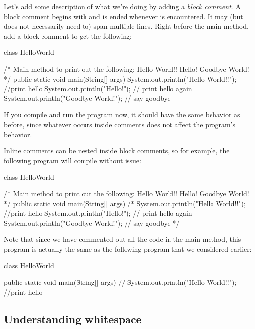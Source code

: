 Let's add some description of what we're doing by adding a \emph{block comment}.
A block comment begins with \ic{/*} and is ended whenever \ic{*/} is encountered.
It may (but does not necessarily need to) span multiple lines.
Right before the main method, add a block comment to get the following:
\begin{code}
class HelloWorld {

    /* Main method to print out the following:
         Hello World!!
         Hello!
         Goodbye World!
    */
    public static void main(String[] args) {
        System.out.println("Hello World!!"); //print hello
        System.out.println("Hello!"); // print hello again
        System.out.println("Goodbye World!"); // say goodbye
    }

}
\end{code}
If you compile and run the program now, it should have the same behavior as before, since whatever occurs
inside comments does not affect the program's behavior.

Inline comments can be nested inside block comments, so for example, the following program
will compile without issue:
\begin{code}
class HelloWorld {

    /* Main method to print out the following:
         Hello World!!
         Hello!
         Goodbye World!
    */
    public static void main(String[] args) {
        /*
        System.out.println("Hello World!!"); //print hello
        System.out.println("Hello!"); // print hello again
        System.out.println("Goodbye World!"); // say goodbye
        */
    }

}
\end{code}
Note that since we have commented out all the code in the main method,
this program is actually the same as the following program that we considered earlier:
\begin{code}
class HelloWorld {

    public static void main(String[] args) {
//        System.out.println("Hello World!!"); //print hello
    }

}
\end{code}

\subsection{Understanding whitespace}

